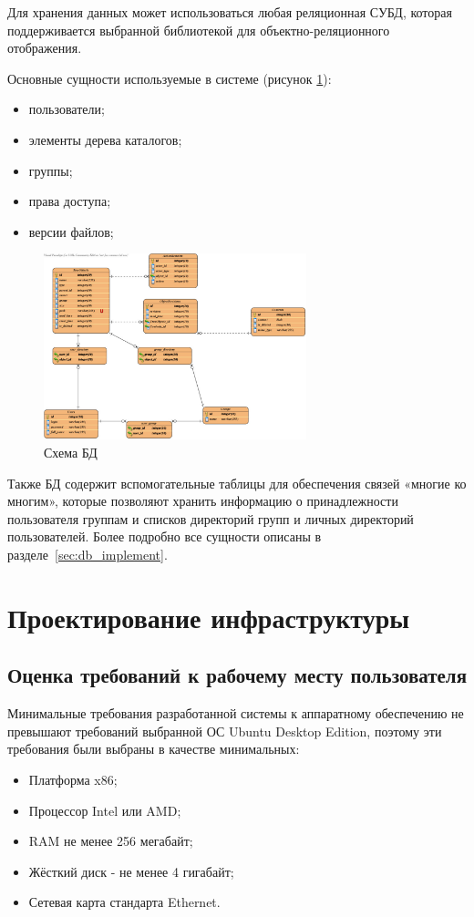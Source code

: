 \documentclass[utf8,usehyperref,12pt]{G7-32}
\begin{document}
Для хранения данных может использоваться любая реляционная СУБД, которая поддерживается выбранной библиотекой для объектно-реляционного отображения. 

Основные сущности используемые в системе (рисунок \ref{fig:db_scheme}):

\begin{itemize}
\item пользователи;
\item элементы дерева каталогов;
\item группы;
\item права доступа;
\item версии файлов;
\end{itemize}

\begin{figure}[h]
   \centering%
   \includegraphics[width=0.68\textwidth, clip, keepaspectratio]{pictures/DB}
   \caption{Схема БД}\label{fig:db_scheme}
 \end{figure}

Также БД содержит вспомогательные таблицы для обеспечения связей «многие ко многим», которые позволяют хранить информацию о принадлежности пользователя группам и списков директорий групп и личных директорий пользователей. Более подробно все сущности описаны в разделе~\ref{sec:db_implement}.

\section{Проектирование инфраструктуры}\label{sect_infra}

\subsection{Оценка требований к рабочему месту пользователя}\label{sect_infra}
Минимальные требования разработанной системы к аппаратному обеспечению не превышают требований выбранной ОС Ubuntu Desktop Edition\cite{ubuntu_req}, поэтому эти требования были выбраны в качестве минимальных:
\begin{itemize}
 \item Платформа x86;
 \item Процессор Intel или AMD;
 \item RAM не менее 256 мегабайт;
 \item Жёсткий диск - не менее 4 гигабайт;
 \item Сетевая карта стандарта Ethernet.
\end{itemize}
\end{document}
